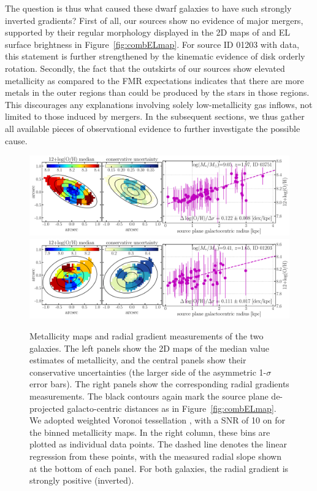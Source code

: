 The question is thus what caused these dwarf galaxies to have such strongly inverted gradients?
First of all, our sources show no evidence of major mergers, supported by their regular morphology displayed in the 2D maps of 
\Mstar and EL surface brightness in Figure~\ref{fig:combELmap}.
For source ID 01203 with \osiris data, this statement is further strengthened by the kinematic evidence of disk orderly rotation.
Secondly, the fact that the outskirts of our sources show elevated metallicity as compared to the FMR 
expectations indicates that there are more metals in the outer regions than could be produced by the stars in those 
regions.
This discourages any explanations involving solely low-metallicity gas inflows, not limited to those induced by mergers.
In the subsequent sections, we thus gather all available pieces of observational evidence to further investigate the possible 
cause.

\begin{figure}
    \centering
    \includegraphics[width=\textwidth]{fig/metalgrad_ID03751.pdf}\\
    \includegraphics[width=\textwidth]{fig/metalgrad_ID01203.pdf}
    \caption[Metallicity maps and radial gradient measurements of the two galaxies.]
    {Metallicity maps and radial gradient measurements of the two galaxies. The left panels show the 2D maps of the median
    value estimates of metallicity, and the central panels show their conservative uncertainties (\ie the larger side of the
    asymmetric 1-$\sigma$ error bars). The right panels show the corresponding radial gradients measurements.
    The black contours again mark the source plane de-projected galacto-centric distances as in 
    Figure~\ref{fig:combELmap}.
    We adopted weighted Voronoi tessellation \citep{Cappellari:2003eu,Diehl:2006cz},
    with a SNR of 10 on \OIII for the binned metallicity maps.
    In the right column, these bins are plotted as individual data points.
    The dashed line denotes the linear regression from these points, with the measured radial slope shown at the bottom of each
    panel.  For both galaxies, the radial gradient is strongly positive (\ie inverted).
    \label{fig:oh12grad}}
\end{figure}


